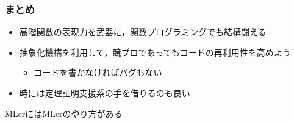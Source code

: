 \documentclass[dvipdfmx,cjk,xcolor=dvipsnames,envcountsect,notheorems,12pt]{beamer}
\theoremstyle{definition}
\begin{document}
\begin{frame}
	\frametitle{まとめ}
	\begin{itemize}
		\item 高階関数の表現力を武器に，関数プログラミングでも結構闘える
		\item 抽象化機構を利用して，競プロであってもコードの再利用性を高めよう
			\begin{itemize}
				\item コードを書かなければバグもない
			\end{itemize}
		\item 時には定理証明支援系の手を借りるのも良い
	\end{itemize}
	\begin{center}
		{\LARGE MLerにはMLerのやり方がある}
	\end{center}
\end{frame}
\end{document}
